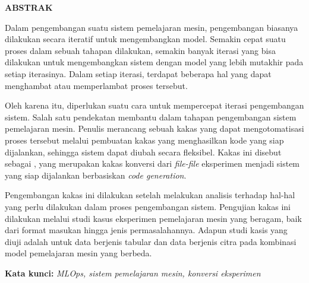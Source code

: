 \clearpage
{}
\begin{center}
  \textbf{\large \MakeUppercase{Abstrak}}\\[3em]
\end{center}

Dalam pengembangan suatu sistem pemelajaran mesin, pengembangan biasanya dilakukan secara iteratif untuk mengembangkan model.
Semakin cepat suatu proses dalam sebuah tahapan dilakukan, semakin banyak iterasi yang bisa dilakukan untuk mengembangkan sistem dengan model yang lebih mutakhir pada setiap iterasinya.
Dalam setiap iterasi, terdapat beberapa hal yang dapat menghambat atau memperlambat proses tersebut.

Oleh karena itu, diperlukan suatu cara untuk mempercepat iterasi pengembangan sistem.
Salah satu pendekatan membantu dalam tahapan pengembangan sistem pemelajaran mesin.
Penulis merancang sebuah kakas yang dapat mengotomatisasi proses tersebut melalui pembuatan kakas yang menghasilkan kode yang siap dijalankan, sehingga sistem dapat diubah secara fleksibel.
Kakas ini disebut sebagai , yang merupakan kakas konversi dari \textit{file-file} eksperimen menjadi sistem yang siap dijalankan berbasiskan \textit{code generation}.

Pengembangan kakas ini dilakukan setelah melakukan analisis terhadap hal-hal yang perlu dilakukan dalam proses pengembangan sistem.
Pengujian kakas ini dilakukan melalui studi kasus eksperimen pemelajaran mesin yang beragam, baik dari format masukan hingga jenis permasalahannya.
Adapun studi kasis yang diuji adalah untuk data berjenis tabular dan data berjenis citra pada kombinasi model pemelajaran mesin yang berbeda.

\noindent \textbf{Kata kunci:}\newline
\emph{MLOps, sistem pemelajaran mesin, konversi eksperimen}
